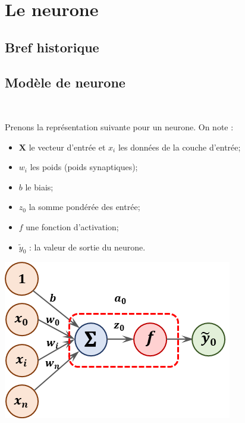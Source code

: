 \section{Le neurone}

\subsection{Bref historique}

\subsection{Modèle de neurone}

\begin{defi} ~\\


\begin{minipage}[c]{.55\linewidth}
Prenons la représentation suivante pour un neurone. On note :
\begin{itemize}
\item $\mathbf{X}$ le vecteur d'entrée et $x_i$ les données de la couche d'entrée;
\item $w_i$ les poids (poids synaptiques);
\item $b$ le biais;
\item $z_0$ la somme pondérée des entrée;
\item $f$ une fonction d'activation; 
\item $\tilde{y}_0$ : la valeur de sortie du neurone.
\end{itemize}
\end{minipage}
\hfill
\begin{minipage}[c]{.4\linewidth}
\begin{center}
\includegraphics[width=.9\linewidth]{images/fig_01}
\end{center}
\end{minipage}


\end{defi}
